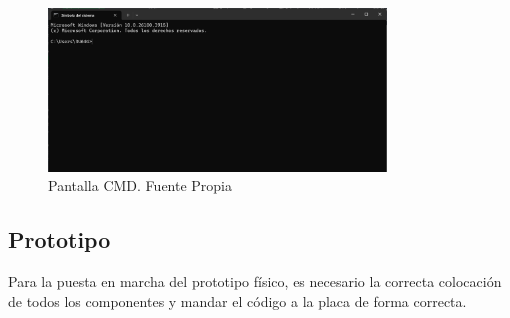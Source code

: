 \begin{figure}[h]
    \centering
    \includegraphics[width=0.8\textwidth]{img/pantalla CMD.png}
    \caption{Pantalla CMD. Fuente Propia}
    \label{fig:CMD}
\end{figure}

\subsection{Prototipo}
Para la puesta en marcha del prototipo físico, es necesario la correcta colocación de todos los componentes y mandar el código a la placa de forma correcta. 

